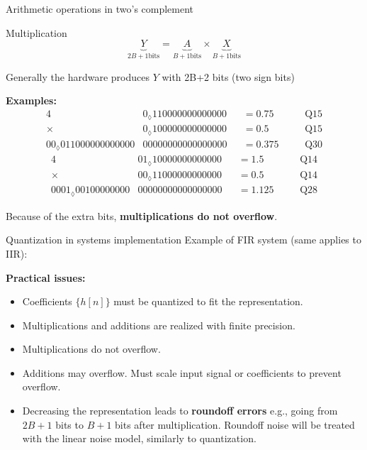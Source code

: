 \documentclass[10pt, aspectratio=169, handout]{beamer}
\begin{document}
%
\begin{frame}{Arithmetic operations in two's complement}
	\begin{block}{Multiplication}
		\begin{equation*}
		\underbrace{Y}_{2B+1 \text{bits}} = \underbrace{A}_{B+1 \text{bits}}\times \underbrace{X}_{B+1 \text{bits}}
		\end{equation*}
		
		Generally the hardware produces $Y$ with 2B+2 bits (two sign bits)
		
		\textbf{Examples:}
		\begin{alignat*}{4}
		&0_\lozenge110000000000000 &&= 0.75 &&&~\text{Q15} \\
		\times & 0_\lozenge100000000000000 &&= 0.5 &&&~\text{Q15} \\
		\hline
		00_\lozenge 011000000000000&00000000000000000 &&= 0.375 &&&~\text{Q30}
		\end{alignat*}
		\vspace{-0.5cm}
		\begin{alignat*}{4}
		&01_\lozenge10000000000000 &&= 1.5 &&&~\text{Q14} \\
		\times & 00_\lozenge11000000000000 &&= 0.5 &&&~\text{Q14} \\
		\hline
		0001_\lozenge 00100000000&00000000000000000 &&= 1.125 &&&~\text{Q28}
		\end{alignat*}
		
		Because of the extra bits, \textbf{multiplications do not overflow}.
		
	\end{block}
\end{frame}

\begin{frame}{Quantization in systems implementation}
Example of FIR system (same applies to IIR):
\begin{center}
	\resizebox{0.8\textwidth}{!}{}
\end{center}

\textbf{Practical issues:}
\begin{itemize}
	\item Coefficients $\{h[n]\}$ must be quantized to fit the representation.
	\item Multiplications and additions are realized with finite precision.
	\item Multiplications do not overflow.
	\item Additions may overflow. Must scale input signal or coefficients to prevent overflow.
	\item Decreasing the representation leads to \textbf{roundoff errors} e.g., going from $2B+1$ bits to $B+1$ bits after multiplication. Roundoff noise will be treated with the linear noise model, similarly to quantization.
\end{itemize}
\end{frame}
\end{document}
